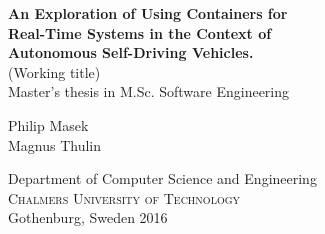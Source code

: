 
\begin{titlepage}
			
\addtolength{\voffset}{2cm}


\mbox{}
\vfill
\renewcommand{\familydefault}{\sfdefault} \normalfont %
\textbf{{\Huge 	An Exploration of Using Containers for \\[0.2cm] Real-Time Systems 
				in the Context of \\[0.2cm] Autonomous Self-Driving Vehicles.
				}} 	\\[1cm]
{\Large (Working title)}\\[0.5cm]
Master's thesis in M.Sc. Software Engineering \setlength{\parskip}{1cm}

{\Large Philip Masek} \setlength{\parskip}{2.9cm}\newline\\
{\Large Magnus Thulin} \setlength{\parskip}{2.9cm}

Department of Computer Science and Engineering \\
\textsc{Chalmers University of Technology} \\
Gothenburg, Sweden 2016

\renewcommand{\familydefault}{\rmdefault} \normalfont %
\end{titlepage}


\newpage
\restoregeometry
\thispagestyle{empty}
\mbox{}


